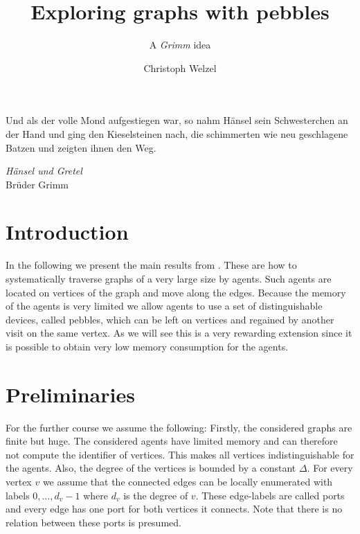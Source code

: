 \documentclass[oneside]{scrartcl}
\begin{document}
\setlength{\epigraphwidth}{0.7\textwidth}

\title{Exploring graphs with pebbles}
\subtitle{A \emph{Grimm} idea}
\author{Christoph Welzel}
\maketitle

\epigraph{Und als der volle Mond aufgestiegen war, so nahm Hänsel sein %
Schwesterchen an der Hand und ging den Kieselsteinen nach, die schimmerten %
wie neu geschlagene Batzen und zeigten ihnen den Weg.}%
{\emph{Hänsel und Gretel}\\Brüder Grimm}

\section{Introduction}
In the following we present the main results from \cite{pebbles}. These are
how to systematically traverse graphs of a very large size by agents. Such
agents are located on vertices of the graph and move along the edges. Because
the memory of the agents is very limited we allow agents to use a set of
distinguishable devices, called pebbles, which can be left on vertices and
regained by another visit on the same vertex. As we will see this is a very
rewarding extension since it is possible to obtain very low memory consumption
for the agents.

\section{Preliminaries}
For the further course we assume the following: Firstly, the considered
graphs are finite but huge. The considered agents have limited memory and can
therefore not compute the identifier of vertices. This makes all vertices
indistinguishable for the agents. Also, the degree of the vertices is bounded
by a constant $\Delta$. For every vertex $v$ we assume that the connected edges
can be locally enumerated with labels $0,\dots,d_{v} - 1$ where $d_{v}$ is the
degree of $v$. These edge-labels are called ports and every edge has one port
for both vertices it connects. Note that there is no relation between these
ports is presumed.
\end{document}
